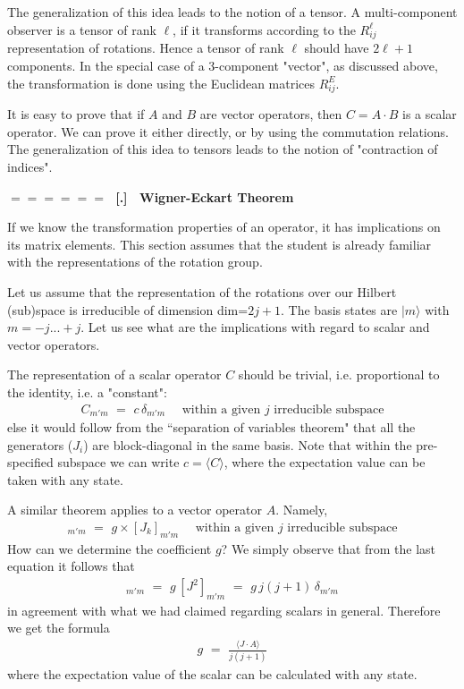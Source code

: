 \documentclass[onecolumn,fleqn]{revtex4}
\newcommand{\beq}{\begin{eqnarray}}
\newcommand{\eeq}{\end{eqnarray}}
\renewcommand{\thesubsection}{\arabic{subsection}}
\renewcommand{\thesubsubsection}{\arabic{subsubsection}}
\newcommand{\sheadC}[1]
{
\addtocounter{subsubsection}{1}
\vspace{5mm}
{\Large\bf $=\!=\!=\!=\!=\!=\;$ [\thesubsection.\thesubsubsection] \ #1}  
\nopagebreak
\phantomsection
}
\begin{document}
The generalization of this idea leads to the 
notion of a tensor. A multi-component observer 
is a tensor of rank $\ell$, if it transforms 
according to the $R^{\ell}_{ij}$ representation  
of rotations. Hence a tensor of rank $\ell$ should
have $2\ell+1$ components.
In the special case of a 3-component "vector", 
as discussed above, the transformation is done using 
the Euclidean matrices $R^E_{ij}$. 

It is easy to prove that if $A$ and $B$ are 
vector operators, then $C=A\cdot B$ is a 
scalar operator. We can prove it either directly, 
or by using the commutation relations.   
The generalization of this idea to tensors 
leads to the notion of "contraction of indices". 


\sheadC{Wigner-Eckart Theorem}

If we know the transformation properties of an operator, 
it has implications on its matrix elements.
This section assumes that the student is already familiar 
with the representations of the rotation group.

Let us assume that the representation of the rotations 
over our Hilbert (sub)space is irreducible of dimension dim=$2j{+}1$.
The basis states are ${|m\rangle}$ with ${m=-j...+j}$. 
Let us see what are the implications 
with regard to scalar and vector operators.  

The representation of a scalar operator $C$ should be trivial, 
i.e. proportional to the identity, i.e. a "constant":   
\beq
C_{m'm} \,\,=\,\, c \, \delta_{m'm}  
\ \ \ \ \ \ \mbox{within a given $j$ irreducible subspace} 
\eeq
else it would follow from the ``separation of variables theorem" 
that all the generators ($J_i$) are block-diagonal in the same basis. 
Note that within the pre-specified subspace 
we can write $c = \langle C \rangle$, 
where the expectation value can be taken with any state.

A similar theorem applies to a vector operator $A$. Namely,  
\beq
[A_k]_{m'm} \,\,=\,\, g \times [J_k]_{m'm}  
\ \ \ \ \ \ \mbox{within a given $j$ irreducible subspace} 
\eeq
How can we determine the coefficient $g$? 
We simply observe that from the last equation 
it follows that 
\beq
[A \cdot J]_{m'm} 
\,\,=\,\, g \, [J^2]_{m'm} 
\,\,=\,\,   g \, j(j+1) \, \delta_{m'm}
\eeq
in agreement with what we had claimed regarding 
scalars in general. Therefore we get the formula 
\beq
g \,\,=\,\, \frac {\langle J \cdot A\rangle}{j(j+1)} 
\eeq
where the expectation value of the scalar 
can be calculated with any state. 
\end{document}
